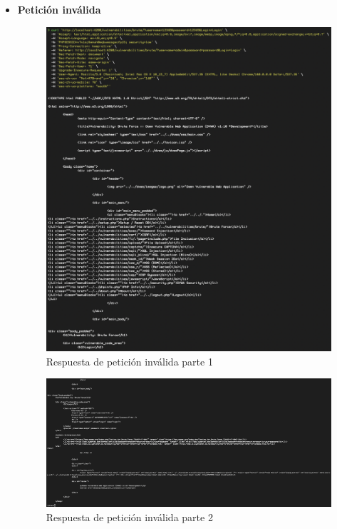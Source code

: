 \documentclass[letter,12pt]{article}
\begin{document}
\begin{itemize}
\begin{figure}[H]
    \end{figure}
    \item \textbf{Petición inválida}
    \begin{figure}[H]
        \centering
        \includegraphics[width=1\linewidth]{Imagenes/cURL_invalid_p1.png}
        \caption{Respuesta de petición inválida parte 1}
        \label{fig:placeholder}
    \end{figure}
    \begin{figure}[H]
        \centering
        \includegraphics[width=1\linewidth]{Imagenes/cURL_invalid_p2.png}
        \caption{Respuesta de petición inválida parte 2}
        \label{fig:placeholder}
    \end{figure}
\end{itemize}
\end{document}
